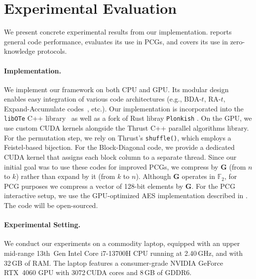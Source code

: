 \section{Experimental Evaluation}\label{sec:eval}

We present concrete experimental results from our implementation.  reports general code performance,  evaluates its use in PCGs, and  covers its use in zero-knowledge protocols.

\paragraph{Implementation.}
We implement our framework on both CPU and GPU. Its modular design enables easy integration of various code architectures (e.g., BDA-$t$, RA-$t$, Expand-Accumulate codes~\cite{EA}, etc.). Our implementation is incorporated into the \texttt{libOTe} C++ library~\cite{libOTe} as well as a fork of Rust libray \texttt{Plonkish} \cite{plonkish}. On the GPU, we use custom CUDA kernels alongside the Thrust C++ parallel algorithms library. For the permutation step, we rely on Thrust's \texttt{shuffle()}, which employs a Feistel-based bijection. For the Block-Diagonal code, we provide a dedicated CUDA kernel that assigns each block column to a separate thread.
Since our initial goal was to use these codes for improved PCGs, we compress by $\mathbf{G}$ (from $n$ to $k$) rather than expand by it (from $k$ to $n$). Although $\mathbf{G}$ operates in $\mathbb{F}_2$, for PCG purposes we compress a vector of 128-bit elements by $\mathbf{G}$. %
For the PCG interactive setup, we use the GPU-optimized AES implementation described in \cite{aesgpu}.
The code will be open-sourced.

\paragraph{Experimental Setting.}
We conduct our experiments on a commodity laptop, equipped with an upper mid-range 13th~Gen Intel Core i7-13700H CPU running at 2.40\,GHz, and with 32\,GB of RAM. The laptop features a consumer-grade NVIDIA GeForce RTX~4060 GPU with 3072\,CUDA cores and 8\,GB of GDDR6.%

